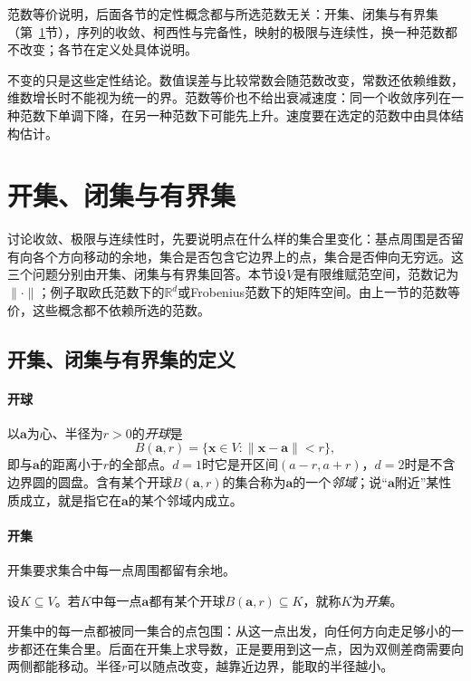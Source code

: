 范数等价说明，后面各节的定性概念都与所选范数无关：开集、闭集与有界集（第~\ref{sec:multivariable-open-closed-sets}节），序列的收敛、柯西性与完备性，映射的极限与连续性，换一种范数都不改变；各节在定义处具体说明。

不变的只是这些定性结论。数值误差与比较常数会随范数改变，常数还依赖维数，维数增长时不能视为统一的界。范数等价也不给出衰减速度：同一个收敛序列在一种范数下单调下降，在另一种范数下可能先上升。速度要在选定的范数中由具体结构估计。

\section{开集、闭集与有界集}
\label{sec:multivariable-open-closed-sets}

讨论收敛、极限与连续性时，先要说明点在什么样的集合里变化：基点周围是否留有向各个方向移动的余地，集合是否包含它边界上的点，集合是否伸向无穷远。这三个问题分别由开集、闭集与有界集回答。本节设$V$是有限维赋范空间，范数记为$\lVert\cdot\rVert$；例子取欧氏范数下的$\mathbb R^d$或Frobenius范数下的矩阵空间。由上一节的范数等价，这些概念都不依赖所选的范数。

\subsection{开集、闭集与有界集的定义}
\label{sec:multivariable-open-closed-definitions}

\paragraph{开球}
以$\bm a$为心、半径为$r>0$的\emph{开球}是
\[
 B(\bm a,r)=\{\bm x\in V:\lVert\bm x-\bm a\rVert<r\},
\]
即与$\bm a$的距离小于$r$的全部点。$d=1$时它是开区间$(a-r,a+r)$，$d=2$时是不含边界圆的圆盘。含有某个开球$B(\bm a,r)$的集合称为$\bm a$的一个\emph{邻域}；说“$\bm a$附近”某性质成立，就是指它在$\bm a$的某个邻域内成立。

\paragraph{开集}
开集要求集合中每一点周围都留有余地。
\begin{definition}[开集]
\label{def:multivariable-open-closed-bounded}
设$K\subseteq V$。若$K$中每一点$\bm a$都有某个开球$B(\bm a,r)\subseteq K$，就称$K$为\emph{开集}。
\end{definition}
开集中的每一点都被同一集合的点包围：从这一点出发，向任何方向走足够小的一步都还在集合里。后面在开集上求导数，正是要用到这一点，因为双侧差商需要向两侧都能移动。半径$r$可以随点改变，越靠近边界，能取的半径越小。

